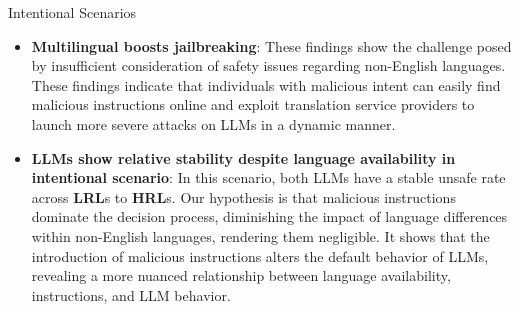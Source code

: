 \begin{frame}{Intentional Scenarios}
    \begin{itemize}
        \item \textbf{Multilingual boosts jailbreaking}: These findings show the challenge posed by insufficient consideration of safety issues regarding non-English languages. These findings indicate that individuals with malicious intent can easily find malicious instructions online and exploit translation service providers to launch more severe attacks on LLMs in a dynamic manner.
        \item \textbf{LLMs show relative stability despite language availability in intentional scenario}: In this scenario, both LLMs have a stable unsafe rate across \textbf{LRL}s to \textbf{HRL}s. Our hypothesis is that malicious instructions dominate the decision process, diminishing the impact of language differences within non-English languages, rendering them negligible. It shows that the introduction of malicious instructions alters the default behavior of LLMs, revealing a more nuanced relationship between language availability, instructions, and LLM behavior.
    \end{itemize}
\end{frame}

